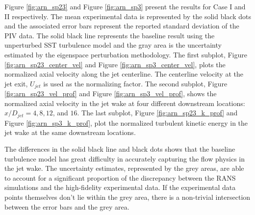 
Figure \ref{fig:arn_sp23} and Figure \ref{fig:arn_sp3} present the results for Case I and II respectively. The mean experimental data is represented by the solid black dots and the associated error bars represent the reported standard deviation of the PIV data. The solid black line represents the baseline result using the unperturbed SST turbulence model and the gray area is the uncertainty estimated by the eigenspace perturbation methodology. The first subplot, Figure \ref{fig:arn_sp23_center_vel} and Figure \ref{fig:arn_sp3_center_vel}, plots the normalized axial velocity along the jet centerline. The centerline velocity at the jet exit, $U_{jet}$ is used as the normalizing factor. The second subplot, Figure \ref{fig:arn_sp23_vel_prof} and Figure \ref{fig:arn_sp3_vel_prof}, shows the normalized axial velocity in the jet wake at four different downstream locations: $x/D_{jet}= 4, 8, 12$, and $16$. The last subplot, Figure \ref{fig:arn_sp23_k_prof} and Figure \ref{fig:arn_sp3_k_prof}, plot the normalized turbulent kinetic energy in the jet wake at the same downstream locations. 

The differences in the solid black line and black dots shows that the baseline turbulence model has great difficulty in accurately capturing the flow physics in the jet wake.  The uncertainty estimates, represented by the grey areas, are able to account for a significant proportion of the discrepancy between the RANS simulations and the high-fidelity experimental data. If the experimental data points themselves don't lie within the grey area, there is a non-trivial intersection between the error bars and the grey area. 




